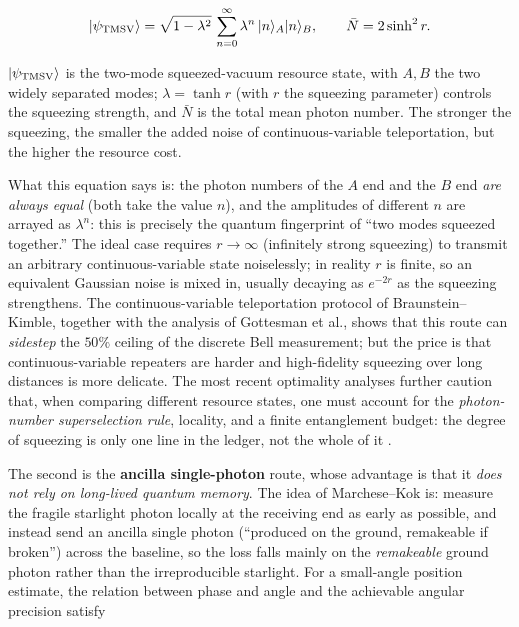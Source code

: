 \begin{equation}
  |\psi_{\rm TMSV}\rangle
  =
  \sqrt{1-\lambda^2}\,
  \sum_{n=0}^{\infty}\lambda^n\,|n\rangle_A|n\rangle_B,
  \qquad
  \bar N=2\sinh^2 r .
  \label{eq:e24-tmsv}
\end{equation}
\begin{formulaexplain}
\(|\psi_{\rm TMSV}\rangle\) is the two-mode squeezed-vacuum resource state, with \(A,B\) the two widely separated modes; \(\lambda=\tanh r\) (with \(r\) the squeezing parameter) controls the squeezing strength, and \(\bar N\) is the total mean photon number. The stronger the squeezing, the smaller the added noise of continuous-variable teleportation, but the higher the resource cost.
\end{formulaexplain}

What this equation says is: the photon numbers of the \(A\) end and the \(B\) end \emph{are always equal} (both take the value \(n\)), and the amplitudes of different \(n\) are arrayed as \(\lambda^n\): this is precisely the quantum fingerprint of ``two modes squeezed together.'' The ideal case requires \(r\to\infty\) (infinitely strong squeezing) to transmit an arbitrary continuous-variable state noiselessly; in reality \(r\) is finite, so an equivalent Gaussian noise is mixed in, usually decaying as \(e^{-2r}\) as the squeezing strengthens. The continuous-variable teleportation protocol of Braunstein--Kimble, together with the analysis of Gottesman et al., shows that this route can \emph{sidestep} the \(50\%\) ceiling of the discrete Bell measurement; but the price is that continuous-variable repeaters are harder and high-fidelity squeezing over long distances is more delicate. The most recent optimality analyses further caution that, when comparing different resource states, one must account for the \emph{photon-number superselection rule}, locality, and a finite entanglement budget: the degree of squeezing is only one line in the ledger, not the whole of it \citep{1998PhRvL..80..869B,2012PhRvL.109g0503G,2025PhRvR...7d3278Z}.

The second is the \textbf{ancilla single-photon} route, whose advantage is that it \emph{does not rely on long-lived quantum memory}. The idea of Marchese--Kok is: measure the fragile starlight photon locally at the receiving end as early as possible, and instead send an ancilla single photon (``produced on the ground, remakeable if broken'') across the baseline, so the loss falls mainly on the \emph{remakeable} ground photon rather than the irreproducible starlight. For a small-angle position estimate, the relation between phase and angle and the achievable angular precision satisfy


